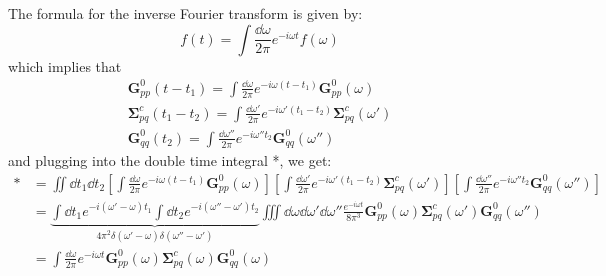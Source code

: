The formula for the inverse Fourier transform is given by:
\begin{equation}
    f(t) = \int \frac{\dd \omega}{2\pi} e^{-i\omega t} f(\omega)
\end{equation}
which implies that
\begin{align}
    \bm{G}_{pp}^{0}(t-t_1) = \int \frac{\dd \omega}{2\pi} e^{-i\omega (t-t_1)} \bm{G}_{pp}^{0}(\omega)\\
    \bm{\Sigma}_{pq}^c(t_1 - t_2) = \int \frac{\dd \omega'}{2\pi} e^{-i\omega' (t_1 - t_2)} \bm{\Sigma}_{pq}^c(\omega')\\
    \bm{G}_{qq}^{0}(t_2) = \int \frac{\dd \omega''}{2\pi} e^{-i\omega'' t_2} \bm{G}_{qq}^{0}(\omega'')
\end{align}
and plugging into the double time integral *, we get:
\begin{align}
    * &= \iint \dd t_1 \dd t_2 \left[\int \frac{\dd \omega}{2\pi} e^{-i\omega (t-t_1)} \bm{G}_{pp}^{0}(\omega)\right] \left[\int \frac{\dd \omega'}{2\pi} e^{-i\omega' (t_1 - t_2)} \bm{\Sigma}_{pq}^c(\omega')\right] \left[\int \frac{\dd \omega''}{2\pi} e^{-i\omega'' t_2} \bm{G}_{qq}^{0}(\omega'')\right]\\
    &= \underbrace{\int \dd t_1 e^{-i \left(\omega' -\omega\right)t_1} \int \dd t_2 e^{-i \left(\omega'' -\omega'\right)t_2}}_{4\pi^2 \delta(\omega' -\omega)\delta(\omega'' -\omega')} \iiint \dd \omega \dd \omega' \dd \omega'' \frac{e^{-i\omega t}}{8\pi^3} \bm{G}_{pp}^{0}(\omega)\bm{\Sigma}_{pq}^c(\omega')\bm{G}_{qq}^{0}(\omega'')\\
    &= \int \frac{\dd \omega}{2\pi} e^{-i\omega t} \bm{G}_{pp}^{0}(\omega)\bm{\Sigma}_{pq}^c(\omega)\bm{G}_{qq}^{0}(\omega)
\end{align}
